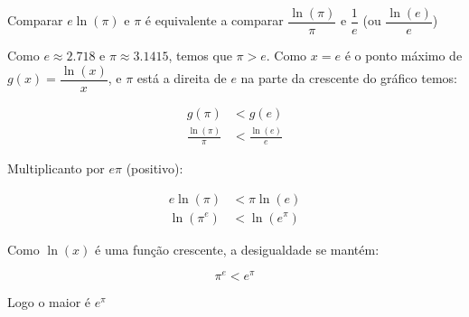 \documentclass[../resumo.tex]{subfiles}
\begin{document}
	Comparar $e \ln(\pi)$ e $\pi$ é equivalente a comparar $\dfrac{\ln(\pi)}{\pi}$ e $\dfrac{1}{e}$
	(ou $\dfrac{\ln(e)}{e}$)

	Como $e \approx 2.718$ e $\pi \approx 3.1415$, temos que $\pi > e$. Como $x = e$ é o ponto máximo
	de $g(x) = \dfrac{\ln(x)}{x}$, e $\pi$ está a direita de $e$ na parte da crescente do gráfico temos:

	\begin{align*}
		g(\pi) &< g(e) \\
		\frac{\ln(\pi)}{\pi} &< \frac{\ln(e)}{e}
	\end{align*}

	Multiplicanto por $e\pi$ (positivo):

	\begin{align*}
		e\ln(\pi) &< \pi\ln(e) \\
		\ln(\pi^e) &< \ln(e^\pi)
	\end{align*}

	Como $\ln(x)$ é uma função crescente, a desigualdade se mantém:

	\[ \pi^e < e^\pi \]

	Logo o maior é \textbf{$e^\pi$}
\end{document}
